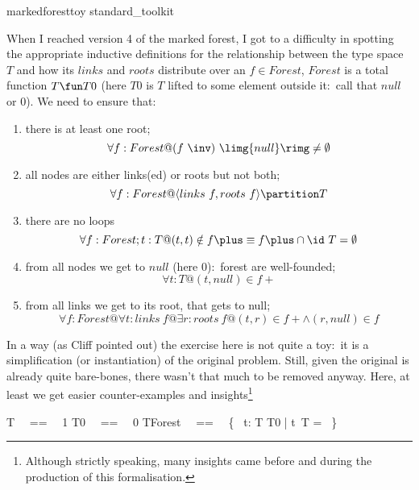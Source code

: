 \documentclass{article}
\begin{document}
\begin{zsection}
  \SECTION markedforesttoy \parents standard\_toolkit %
\end{zsection}

When I reached version 4 of the marked forest, I got to a difficulty in spotting the appropriate
inductive definitions for the relationship between the type space $T$ and how its $links$ and
$roots$ distribute over an $f \in Forest$, $Forest$ is a total function $T \fun T0$ (here $T0$ is
$T$ lifted to some element outside it:~call that $null$ or $0$). We need to ensure that:
%
\begin{enumerate}
	\item there is at least one root;
		\[ \forall f: Forest @ (f~\inv)~\limg \{ null \} \rimg \neq \emptyset \]

	\item all nodes are either links(ed) or roots but not both;
		\[ \forall f: Forest @ \langle links~f, roots~f \rangle \partition T \]

	\item there are no loops
		\[ \forall f: Forest; t: T @ (t, t) \notin f\plus \equiv f\plus \cap \id~T = \emptyset \]

	\item from all nodes we get to $null$ (here $0$):~forest are well-founded;
		\[ \forall t: T @ (t, null) \in f\plus \]

	\item from all links we get to its root, that gets to null;
		\[ \forall f: Forest @ \forall t: links~f @ \exists r: roots~f @ (t,r) \in f\plus \land (r, null) \in f \]
\end{enumerate}
%
In a way (as Cliff pointed out) the exercise here is not quite a toy:~it is a simplification
(or instantiation) of the original problem. Still, given the original is already quite bare-bones,
there wasn't that much to be removed anyway. Here, at least we get easier counter-examples and
insights\footnote{Although strictly speaking, many insights came before and during the production of this formalisation.}

\begin{zed}
   T ~~==~~ 1 
   \also
   T0 ~~==~~ 0 
   \also
   TForest ~~==~~ \{~ t: T \fun T0 | t\plus \cap \id~T = \emptyset ~\}
\end{zed}

\end{document}
